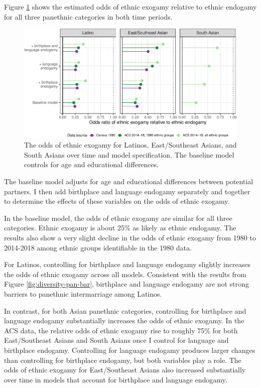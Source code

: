\documentclass[11pt,]{article}
\begin{document}
Figure \ref{fig:exog-lolly} shows the estimated odds of ethnic exogamy relative to ethnic endogamy for all three panethnic categories in both time periods.

\begin{figure}
\centering
\includegraphics{main_files/figure-latex/exog-lolly-1.pdf}
\caption{\label{fig:exog-lolly}The odds of ethnic exogamy for Latinos, East/Southeast Asians, and South Asians over time and model specification. The baseline model controls for age and educational differences.}
\end{figure}

The baseline model adjusts for age and educational differences between potential partners. I then add birthplace and language endogamy separately and together to determine the effects of these variables on the odds of ethnic exogamy.

In the baseline model, the odds of ethnic exogamy are similar for all three categories. Ethnic exogamy is about 25\% as likely as ethnic endogamy. The results also show a very slight decline in the odds of ethnic exogamy from 1980 to 2014-2018 among ethnic groups identifiable in the 1980 data.

For Latinos, controlling for birthplace and language endogamy slightly increases the odds of ethnic exogamy across all models. Consistent with the results from Figure \ref{fig:diversity-pan-bar}, birthplace and language endogamy are not strong barriers to panethnic intermarriage among Latinos.

In contrast, for both Asian panethnic categories, controlling for birthplace and language endogamy substantially increases the odds of ethnic exogamy. In the ACS data, the relative odds of ethnic exogamy rise to roughly 75\% for both East/Southeast Asians and South Asians once I control for language and birthplace endogamy. Controlling for language endogamy produces larger changes than controlling for birthplace endogamy, but both variables play a role. The odds of ethnic exogamy for East/Southeast Asians also increased substantially over time in models that account for birthplace and language endogamy.
\end{document}
